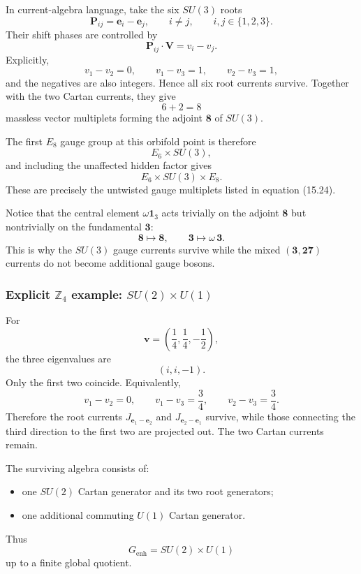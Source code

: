 \documentclass[
  10pt,
  a4paper,
  openany]{book}
\providecommand{\tightlist}{%
  \setlength{\itemsep}{0pt}\setlength{\parskip}{0pt}}
\begin{document}
In current-algebra language, take the six \(SU(3)\) roots \[
\mathbf P_{ij}=\mathbf e_i-\mathbf e_j,
\qquad
i\neq j,
\qquad
i,j\in\{1,2,3\}.
\] Their shift phases are controlled by \[
\mathbf P_{ij}\cdot\mathbf V
=
v_i-v_j.
\] Explicitly, \[
v_1-v_2=0,
\qquad
v_1-v_3=1,
\qquad
v_2-v_3=1,
\] and the negatives are also integers. Hence all six root currents
survive. Together with the two Cartan currents, they give \[
6+2=8
\] massless vector multiplets forming the adjoint \(\mathbf8\) of
\(SU(3)\).

The first \(E_8\) gauge group at this orbifold point is therefore \[
\boxed{
E_6\times SU(3)
},
\] and including the unaffected hidden factor gives \[
\boxed{
E_6\times SU(3)\times E_8
}.
\] These are precisely the untwisted gauge multiplets listed in equation
(15.24).

Notice that the central element \(\omega\mathbf1_3\) acts trivially on
the adjoint \(\mathbf8\) but nontrivially on the fundamental
\(\mathbf3\): \[
\mathbf8\longmapsto\mathbf8,
\qquad
\mathbf3\longmapsto\omega\,\mathbf3.
\] This is why the \(SU(3)\) gauge currents survive while the mixed
\((\mathbf3,\mathbf{27})\) currents do not become additional gauge
bosons.

\subsubsection{\texorpdfstring{Explicit \(\mathbb Z_4\) example:
\(SU(2)\times U(1)\)}{Explicit \textbackslash mathbb Z\_4 example: SU(2)\textbackslash times U(1)}}\label{explicit-mathbb-z_4-example-su2times-u1}

For \[
\mathbf v
=
\left(
\frac14,\frac14,-\frac12
\right),
\] the three eigenvalues are \[
(i,i,-1).
\] Only the first two coincide. Equivalently, \[
v_1-v_2=0,
\qquad
v_1-v_3=\frac34,
\qquad
v_2-v_3=\frac34.
\] Therefore the root currents \(J_{\mathbf e_1-\mathbf e_2}\) and
\(J_{\mathbf e_2-\mathbf e_1}\) survive, while those connecting the
third direction to the first two are projected out. The two Cartan
currents remain.

The surviving algebra consists of:

\begin{itemize}
\tightlist
\item
  one \(SU(2)\) Cartan generator and its two root generators;
\item
  one additional commuting \(U(1)\) Cartan generator.
\end{itemize}

Thus \[
\boxed{
G_{\mathrm{enh}}
=
SU(2)\times U(1)
}
\] up to a finite global quotient.
\end{document}
